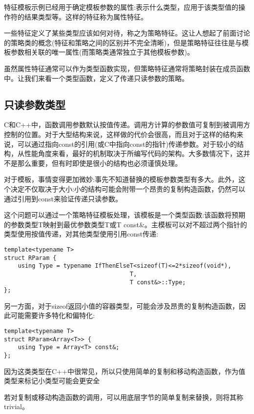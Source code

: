 
特征模板示例已经用于确定模板参数的属性:表示什么类型，应用于该类型值的操作符的结果类型等。这样的特征称为属性特征。

一些特征定义了某些类型应该如何对待，称之为策略特征。这让人想起了前面讨论的策略类的概念(特征和策略之间的区别并不完全清晰)，但是策略特征往往是与模板参数相关联的唯一属性(而策略类通常独立于其他模板参数)。

虽然属性特征通常可以作为类型函数实现，但策略特征通常将策略封装在成员函数中。让我们来看一个类型函数，定义了传递只读参数的策略。

\subsection{只读参数类型}

C和C++中，函数调用参数默认按值传递。调用方计算的参数值可复制到被调用方控制的位置。对于大型结构来说，这样做的代价会很高，而且对于这样的结构来说，可以通过指向const的引用(或C中指向const的指针)传递参数。对于较小的结构，从性能角度来看，最好的机制取决于所编写代码的架构。大多数情况下，这并不是那么重要，但有时即使是很小的结构也必须谨慎处理。

对于模板，事情变得更加微妙:事先不知道替换的模板参数类型有多大。此外，这个决定不仅取决于大小:小的结构可能会附带一个昂贵的复制构造函数，仍然可以通过引用到const来验证传递只读参数。

这个问题可以通过一个策略特征模板处理，该模板是一个类型函数:该函数将预期的参数类型T映射到最优参数类型T或T const\&。主模板可以对不超过两个指针的类型使用按值传递，对其他类型使用引用const传递:

\begin{lstlisting}[style=styleCXX]
template<typename T>
struct RParam {
	using Type = typename IfThenElseT<sizeof(T)<=2*sizeof(void*),
									T,
									T const&>::Type;
};
\end{lstlisting}

另一方面，对于sizeof返回小值的容器类型，可能会涉及昂贵的复制构造函数，因此可能需要许多特化和偏特化:

\begin{lstlisting}[style=styleCXX]
template<typename T>
struct RParam<Array<T>> {
	using Type = Array<T> const&;
};
\end{lstlisting}

因为这类类型在C++中很常见，所以只使用简单的复制和移动构造函数，作为值类型来标记小类型可能会更安全

\begin{tcolorbox}[colback=webgreen!5!white,colframe=webgreen!75!black]
\hspace*{0.75cm}若对复制或移动构造函数的调用，可以用底层字节的简单复制来替换，则将其称trivial。
\end{tcolorbox}

